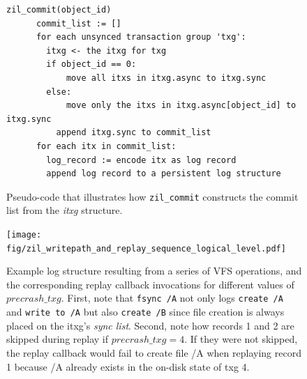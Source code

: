 \documentclass[12pt,a4paper,twoside]{book}
\begin{document}
\begin{figure}[H]
\begin{lstlisting}[style=figurepseudocode]
    zil_commit(object_id)
      commit_list := []
      for each unsynced transaction group 'txg':
        itxg <- the itxg for txg
        if object_id == 0:
            move all itxs in itxg.async to itxg.sync
        else:
            move only the itxs in itxg.async[object_id] to itxg.sync
          append itxg.sync to commit_list
      for each itx in commit_list:
        log_record := encode itx as log record
        append log record to a persistent log structure
    \end{lstlisting}
    \caption{Pseudo-code that illustrates how \lstinline{zil_commit} constructs the commit list from the \textit{itxg} structure.}
    \label{fig:zil_commit_itxg_pseudocode}
\end{figure}

\begin{figure}[H]
    \centering
    \texttt{[image: fig/zil\_writepath\_and\_replay\_sequence\_logical\_level.pdf]}
    \caption{
        Example log structure resulting from a series of VFS operations, and the corresponding replay callback invocations for different values of $precrash\_txg$.
        First, note that \lstinline{fsync /A} not only logs \lstinline{create /A} and \lstinline{write to /A} but also \lstinline{create /B} since file creation is always placed on the itxg's \textit{sync list}.
        Second, note how records 1 and 2 are skipped during replay if $precrash\_txg = 4$.
        If they were not skipped, the replay callback would fail to create file /A when replaying record 1 because /A already exists in the on-disk state of txg 4.
    }
    \label{fig:zil_writepath_and_replay_sequence_logical_level}
\end{figure}
\end{document}
